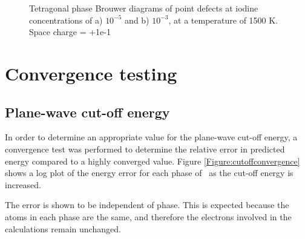 \begin{figure}[htp]
\begin{center}
		\caption{Tetragonal phase Brouwer diagrams of point defects at iodine concentrations of a) $10^{-5}$ and b) $10^{-3}$, at a temperature of 1500 K. Space charge = +1e-1}
	\end{center}
\end{figure}

\section{Convergence testing}

\subsection{Plane-wave cut-off energy}

In order to determine an appropriate value for the plane-wave cut-off energy, a convergence test was performed to determine the relative error in predicted energy compared to a highly converged value. Figure \ref{Figure:cutoffconvergence} shows a log plot of the energy error for each phase of \zirconia\ as the cut-off energy is increased. 

The error is shown to be independent of phase. This is expected because the atoms in each phase are the same, and therefore the electrons involved in the calculations remain unchanged.


